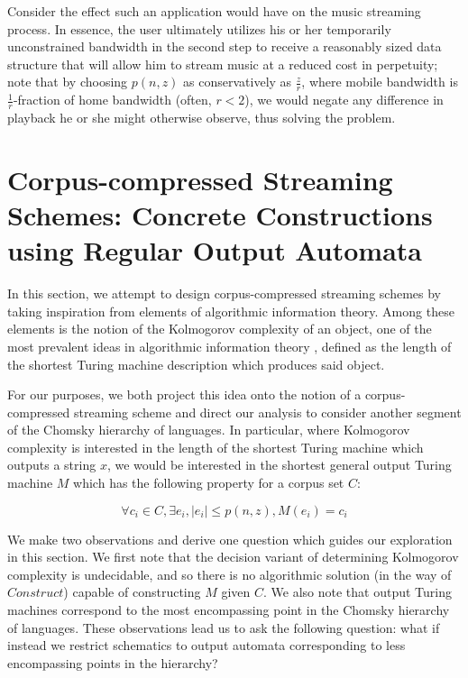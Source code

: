 \documentclass{article}
\theoremstyle{definition}
\begin{document}
Consider the effect such an application would have on the music streaming process.  In essence, the 
user ultimately utilizes his or her temporarily unconstrained bandwidth in the second step to 
receive a reasonably sized data structure that will allow him to stream music at a reduced 
cost in perpetuity; note that by choosing $p(n,z)$ as conservatively as $\frac{z}{r}$, where mobile 
bandwidth is $\frac{1}{r}$-fraction of home bandwidth (often, $r < 2$), 
we would negate any difference in playback he or she might otherwise observe, thus solving the problem.   

\section{Corpus-compressed Streaming Schemes: Concrete Constructions using 
Regular Output Automata}

In this section, we attempt to design corpus-compressed streaming schemes by taking 
inspiration from elements of algorithmic information theory.  Among these elements is the notion of the Kolmogorov complexity of an object, 
one of the most prevalent ideas in algorithmic information theory \cite{CondKolmog}, defined as the length of the shortest Turing machine description which produces said object.

For our purposes, we both project this idea onto the notion of a corpus-compressed streaming scheme 
and direct our analysis to consider another segment of the 
Chomsky hierarchy of languages.  In particular, where Kolmogorov complexity is interested 
in the length of the shortest Turing machine which outputs a string $x$, we would be interested 
in the shortest general output Turing machine $M$ which has the following property for a corpus 
set $C$:

\[ \forall c_i \in C, \exists e_i, \lvert e_i \rvert \leq p(n,z), M(e_i) = c_i \]

We make two observations and derive one question which guides our exploration in this section.
We first note that the decision variant of determining Kolmogorov complexity 
is undecidable, and so there is no algorithmic solution (in the way of $Construct$) capable 
of constructing $M$ given $C$.  We also note that output Turing machines correspond to the 
most encompassing point in the Chomsky hierarchy of languages.  These observations lead 
us to ask the following question: what if instead we restrict schematics to output automata 
corresponding to less encompassing points in the hierarchy?
\end{document}
